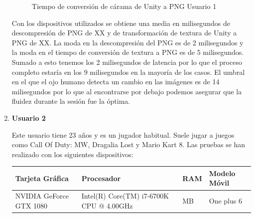 \begin{enumerate}
\begin{figure}[!h]
\centering
{}%
\caption{Tiempo de conversi\'on de c\'arama de Unity a PNG Usuario 1}
\end{figure}

Con los dispositivos utilizados se obtiene una media en milisegundos de descompresi\'on de PNG de XX y de transformaci\'on de textura de Unity a PNG de XX. La moda en la descompresi\'on del PNG es de 2 milisegundos y la moda en el tiempo de conversi\'on de textura a PNG es de 5 milisegundos. Sumado a esto tenemos los 2 milisegundos de latencia por lo que el proceso completo estar\'ia en los 9 milisegundos en la mayor\'ia de los casos. El umbral en el que el ojo humano detecta un cambio en las im\'agenes es de 14 milisegundos por lo que al encontrarse por debajo podemos asegurar que la fluidez durante la sesi\'on fue la \'optima.

\newpage \item \textbf{Usuario 2}

Este usuario tiene 23 a\~nos y es un jugador habitual. Suele jugar a juegos como Call Of Duty: MW, Dragalia Lost y Mario Kart 8.
Las pruebas se han realizado con los siguientes dispositivos: \\

\begin{tabularx}{1.0\textwidth} { 
  | >{\centering\arraybackslash}X 
  | >{\centering\arraybackslash}X 
  | >{\centering\arraybackslash}X 
  | >{\centering\arraybackslash}X | }
 \hline
 \textbf{Tarjeta Gr\'afica} & \textbf{Procesador} & \textbf{RAM} & \textbf{Modelo M\'ovil} \\
 \hline
 NVIDIA GeForce GTX 1080  &Intel(R) Core(TM) i7-6700K CPU @ 4.00GHz  & 16327 MB & One plus 6  \\
\hline
\end{tabularx}



\end{enumerate}
